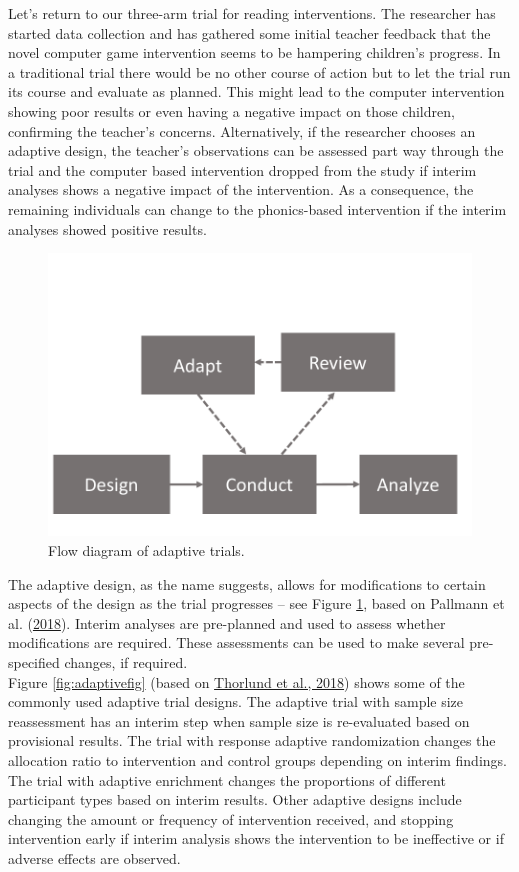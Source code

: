 \documentclass{krantz}
\begin{document}
Let's return to our three-arm trial for reading interventions. The researcher has started data collection and has gathered some initial teacher feedback that the novel computer game intervention seems to be hampering children's progress. In a traditional trial there would be no other course of action but to let the trial run its course and evaluate as planned. This might lead to the computer intervention showing poor results or even having a negative impact on those children, confirming the teacher's concerns. Alternatively, if the researcher chooses an adaptive design, the teacher's observations can be assessed part way through the trial and the computer based intervention dropped from the study if interim analyses shows a negative impact of the intervention. As a consequence, the remaining individuals can change to the phonics-based intervention if the interim analyses showed positive results.

\begin{figure}

{\centering \includegraphics[width=0.75\linewidth]{images_bw/adaptive_flow} 

}

\caption{Flow diagram of adaptive trials.}\label{fig:adaptiveflow}
\end{figure}

The adaptive design, as the name suggests, allows for modifications to certain aspects of the design as the trial progresses -- see Figure \ref{fig:adaptiveflow}, based on Pallmann et al. (\protect\hyperlink{ref-pallmann2018}{2018}). Interim analyses are pre-planned and used to assess whether modifications are required. These assessments can be used to make several pre-specified changes, if required.\\
Figure \ref{fig:adaptivefig} (based on \protect\hyperlink{ref-thorlund2018}{Thorlund et al., 2018}) shows some of the commonly used adaptive trial designs. The adaptive trial with sample size reassessment has an interim step when sample size is re-evaluated based on provisional results. The trial with response adaptive randomization changes the allocation ratio to intervention and control groups depending on interim findings. The trial with adaptive enrichment changes the proportions of different participant types based on interim results. Other adaptive designs include changing the amount or frequency of intervention received, and stopping intervention early if interim analysis shows the intervention to be ineffective or if adverse effects are observed.
\end{document}
